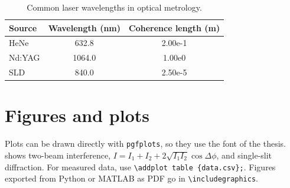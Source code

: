 \begin{table}[htb]
    \centering
    \caption{Common laser wavelengths in optical metrology.}
    \label{tab:wavelengths}
    \begin{tabular}{l S[table-format=4.1] S[table-format=1.2e1]}
        \toprule
        Source    & {Wavelength (\unit{nm})} & {Coherence length (\unit{m})} \\
        \midrule
        HeNe      & 632.8  & 2.00e-1 \\
        Nd:YAG    & 1064.0 & 1.00e0  \\
        SLD       & 840.0  & 2.50e-5 \\
        \bottomrule
    \end{tabular}
\end{table}

\section{Figures and plots}
\label{sec:figures}

Plots can be drawn directly with \texttt{pgfplots}, so they use the font of the thesis.  shows two-beam interference, $I = I_1 + I_2 + 2\sqrt{I_1 I_2}\cos\Delta\phi$, and single-slit diffraction. For measured data, use \texttt{\textbackslash addplot table \{data.csv\};}. Figures exported from Python or MATLAB as PDF go in \texttt{\textbackslash includegraphics}.

